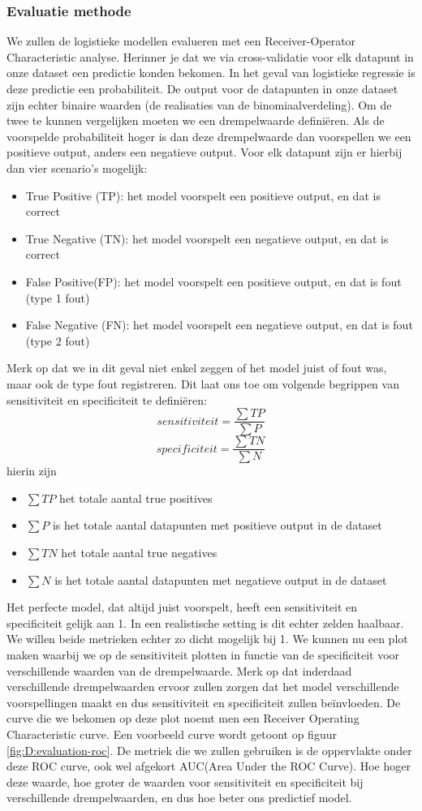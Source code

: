 \begin{abstract*}
\subsubsection{Evaluatie methode}
We zullen de logistieke modellen evalueren met een Receiver-Operator Characteristic analyse. Herinner je dat we via cross-validatie voor elk datapunt in onze dataset een predictie konden bekomen. In het geval van logistieke regressie is deze predictie een probabiliteit. De output voor de datapunten in onze dataset zijn echter binaire waarden (de realisaties van de binomiaalverdeling). Om de twee te kunnen vergelijken moeten we een drempelwaarde defini\"eren. Als de voorspelde probabiliteit hoger is dan deze drempelwaarde dan voorspellen we een positieve output, anders een negatieve output. Voor elk datapunt zijn er hierbij dan vier scenario's mogelijk:
\begin{itemize}
	\item True Positive (TP): het model voorspelt een positieve output, en dat is correct
	\item True Negative (TN): het model voorspelt een negatieve output, en dat is correct
	\item False Positive(FP): het model voorspelt een positieve output, en dat is fout (type 1 fout)
	\item False Negative (FN): het model voorspelt een negatieve output, en dat is fout (type 2 fout)
\end{itemize}
Merk op dat we in dit geval niet enkel zeggen of het model juist of fout was, maar ook de type fout registreren. Dit laat ons toe om volgende begrippen van sensitiviteit en specificiteit te defini\"eren:
$$
sensitiviteit = \frac{\sum{TP}}{\sum{P}}
$$
$$
specificiteit = \frac{\sum{TN}}{\sum{N}}
$$
hierin zijn
\begin{itemize}
	\item $\sum{TP}$ het totale aantal true positives
	\item $\sum{P}$ is het totale aantal datapunten met positieve output in de dataset
	\item $\sum{TN}$ het totale aantal true negatives
	\item $\sum{N}$ is het totale aantal datapunten met negatieve output in de dataset
\end{itemize}
Het perfecte model, dat altijd juist voorspelt, heeft een sensitiviteit en specificiteit gelijk aan 1. In een realistische setting is dit echter zelden haalbaar. We willen beide metrieken echter zo dicht mogelijk bij 1. We kunnen nu een plot maken waarbij we op de sensitiviteit plotten in functie van de specificiteit voor verschillende waarden van de drempelwaarde. Merk op dat inderdaad verschillende drempelwaarden ervoor zullen zorgen dat het model verschillende voorspellingen maakt en dus sensitiviteit en specificiteit zullen be\"invloeden. De curve die we bekomen op deze plot noemt men een Receiver Operating Characteristic curve. Een voorbeeld curve wordt getoont op figuur \ref{fig:D:evaluation-roc}. De metriek die we zullen gebruiken is de oppervlakte onder deze ROC curve, ook wel afgekort AUC(Area Under the ROC Curve). Hoe hoger deze waarde, hoe groter de waarden voor sensitiviteit en specificiteit bij verschillende drempelwaarden, en dus hoe beter ons predictief model.

\end{abstract*}
